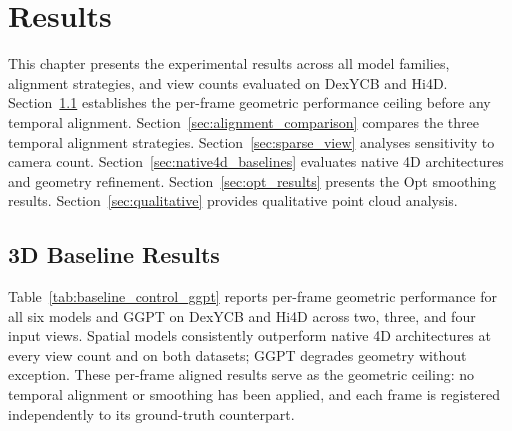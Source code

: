 \chapter{Results}
\label{c:results}

This chapter presents the experimental results across all model families, alignment
strategies, and view counts evaluated on DexYCB and Hi4D. Section~\ref{sec:3d_baseline}
establishes the per-frame geometric performance ceiling before any temporal alignment.
Section~\ref{sec:alignment_comparison} compares the three temporal alignment strategies.
Section~\ref{sec:sparse_view} analyses sensitivity to camera count.
Section~\ref{sec:native4d_baselines} evaluates native 4D architectures and geometry
refinement. Section~\ref{sec:opt_results} presents the Opt smoothing results.
Section~\ref{sec:qualitative} provides qualitative point cloud analysis.

\section{3D Baseline Results}
\label{sec:3d_baseline}

Table~\ref{tab:baseline_control_ggpt} reports per-frame geometric performance 
for all six models and GGPT on DexYCB and Hi4D across two, three, and four 
input views. Spatial models consistently outperform native 4D architectures at 
every view count and on both datasets; GGPT degrades geometry without exception. 
These per-frame aligned results serve as the geometric ceiling: no temporal 
alignment or smoothing has been applied, and each frame is registered 
independently to its ground-truth counterpart.


